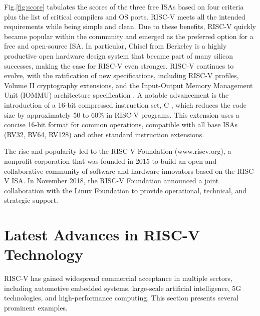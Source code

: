 \documentclass[journal]{IEEEtran}
\begin{document}
Fig.\ref{fig:score} tabulates the scores of the three free ISAs based on four criteria plus the list of critical compilers and OS ports. RISC-V meets all the intended requirements while being simple and clean. Due to these benefits, RISC-V quickly became popular within the community and emerged as the preferred option for a free and open-source ISA. In particular, Chisel \cite{bachrach_chisel_2012} from Berkeley is a highly productive open hardware design system that became part of many silicon successes, making the case for RISC-V even stronger. 
RISC-V continues to evolve, with the ratification of new specifications, including RISC-V profiles, Volume II cryptography extensions, and the Input-Output Memory Management Unit (IOMMU) architecture specification \cite{mcmahon_risc-v_nodate}.
A notable advancement is the introduction of a 16-bit compressed instruction set, C \cite{waterman_risc-v_2015}, which reduces the code size by approximately 50 to 60\% in RISC-V programs. This extension uses a concise 16-bit format for common operations, compatible with all base ISAs (RV32, RV64, RV128) and other standard instruction extensions.

The rise and popularity led to the RISC-V Foundation (www.riscv.org), a nonprofit corporation that was founded in 2015 to build an open and collaborative community of software and hardware innovators based on the RISC-V ISA. In November 2018, the RISC-V Foundation announced a joint collaboration with the Linux Foundation to provide operational, technical, and strategic support.

\section{Latest Advances in RISC-V Technology}
RISC-V has gained widespread commercial acceptance in multiple sectors, including automotive embedded systems, large-scale artificial intelligence, 5G technologies, and high-performance computing. This section presents several prominent examples.
\end{document}
